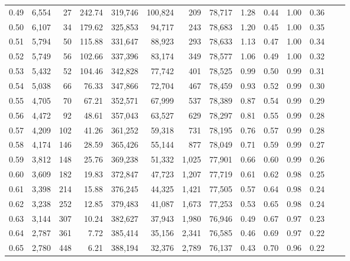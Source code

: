 \begin{tabular}{rrrrrrrrrrrrrr}
0.49 &  6,554 &     27 &   242.74 &  319,746 &  100,824 &     209 &  78,717 &  1.28 &  0.44 &  1.00 &      0.36 \\
0.50 &  6,107 &     34 &   179.62 &  325,853 &   94,717 &     243 &  78,683 &  1.20 &  0.45 &  1.00 &      0.35 \\
0.51 &  5,794 &     50 &   115.88 &  331,647 &   88,923 &     293 &  78,633 &  1.13 &  0.47 &  1.00 &      0.34 \\
0.52 &  5,749 &     56 &   102.66 &  337,396 &   83,174 &     349 &  78,577 &  1.06 &  0.49 &  1.00 &      0.32 \\
0.53 &  5,432 &     52 &   104.46 &  342,828 &   77,742 &     401 &  78,525 &  0.99 &  0.50 &  0.99 &      0.31 \\
0.54 &  5,038 &     66 &    76.33 &  347,866 &   72,704 &     467 &  78,459 &  0.93 &  0.52 &  0.99 &      0.30 \\
0.55 &  4,705 &     70 &    67.21 &  352,571 &   67,999 &     537 &  78,389 &  0.87 &  0.54 &  0.99 &      0.29 \\
0.56 &  4,472 &     92 &    48.61 &  357,043 &   63,527 &     629 &  78,297 &  0.81 &  0.55 &  0.99 &      0.28 \\
0.57 &  4,209 &    102 &    41.26 &  361,252 &   59,318 &     731 &  78,195 &  0.76 &  0.57 &  0.99 &      0.28 \\
0.58 &  4,174 &    146 &    28.59 &  365,426 &   55,144 &     877 &  78,049 &  0.71 &  0.59 &  0.99 &      0.27 \\
0.59 &  3,812 &    148 &    25.76 &  369,238 &   51,332 &   1,025 &  77,901 &  0.66 &  0.60 &  0.99 &      0.26 \\
0.60 &  3,609 &    182 &    19.83 &  372,847 &   47,723 &   1,207 &  77,719 &  0.61 &  0.62 &  0.98 &      0.25 \\
0.61 &  3,398 &    214 &    15.88 &  376,245 &   44,325 &   1,421 &  77,505 &  0.57 &  0.64 &  0.98 &      0.24 \\
0.62 &  3,238 &    252 &    12.85 &  379,483 &   41,087 &   1,673 &  77,253 &  0.53 &  0.65 &  0.98 &      0.24 \\
0.63 &  3,144 &    307 &    10.24 &  382,627 &   37,943 &   1,980 &  76,946 &  0.49 &  0.67 &  0.97 &      0.23 \\
0.64 &  2,787 &    361 &     7.72 &  385,414 &   35,156 &   2,341 &  76,585 &  0.46 &  0.69 &  0.97 &      0.22 \\
0.65 &  2,780 &    448 &     6.21 &  388,194 &   32,376 &   2,789 &  76,137 &  0.43 &  0.70 &  0.96 &      0.22 \\

\end{tabular}
